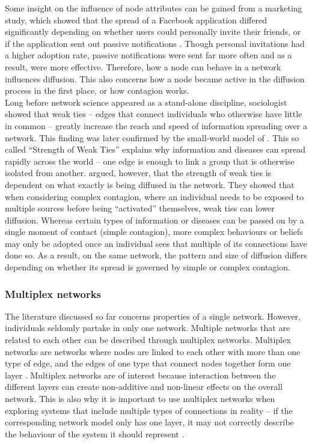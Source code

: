\documentclass[10pt,a4paper]{article}
\begin{document}
Some insight on the influence of node attributes can be gained from a marketing study, which showed that the spread of a Facebook application differed significantly depending on whether users could personally invite their friends, or if the application sent out passive notifications \cite{Aral2011}. Though personal invitations had a higher adoption rate, passive notifications were sent far more often and as a result, were more effective. Therefore, how a node can behave in a network influences diffusion. This also concerns how a node became active in the diffusion process in the first place, or how contagion works. \\

Long before network science appeared as a stand-alone discipline, sociologist \cite{Granovetter1977} showed that weak ties – edges that connect individuals who otherwise have little in common – greatly increase the reach and speed of information spreading over a network. This finding was later confirmed by the small-world model of \cite{Watts1998}. This so called “Strength of Weak Ties” explains why information and diseases can spread rapidly across the world – one edge is enough to link a group that is otherwise isolated from another. \cite{Centola2007} argued, however, that the strength of weak ties is dependent on what exactly is being diffused in the network. They showed that when considering complex contagion, where an individual needs to be exposed to multiple sources before being “activated” themselves, weak ties can lower diffusion. Whereas certain types of information or diseases can be passed on by a single moment of contact (simple contagion), more complex behaviours or beliefs may only be adopted once an individual sees that multiple of its connections have done so. As a result, on the same network, the pattern and size of diffusion differs depending on whether its spread is governed by simple or complex contagion.

\subsubsection{Multiplex networks} \label{sec:multiplex}
The literature discussed so far concerns properties of a single network. However, individuals seldomly partake in only one network. Multiple networks that are related to each other can be described through multiplex networks. Multiplex networks are networks where nodes are linked to each other with more than one type of edge, and the edges of one type that connect nodes together form one layer \citep{Lee2015}. Multiplex networks are of interest because interaction between the different layers can create non-additive and non-linear effects on the overall network. This is also why it is important to use multiplex networks when exploring systems that include multiple types of connections in reality – if the corresponding network model only has one layer, it may not correctly describe the behaviour of the system it should represent \citep{Lee2015}. \\
\end{document}
